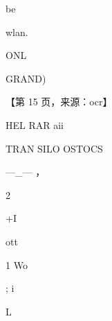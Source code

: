 \documentclass[UTF8,12pt,a4paper,openany]{ctexbook}
\begin{document}
\begin{enumerate}[label=\textbf{\arabic*.},leftmargin=2em]
be\par wlan.\par ONL\par GRAND)\par \par 【第 15 页，来源：ocr】\par HEL RAR aii\par TRAN SILO OSTOCS\par —\_—                               ，\par 2\par +I\par ott\par 1                    Wo\par ;                 i\par L                  
\end{enumerate}
\end{document}
